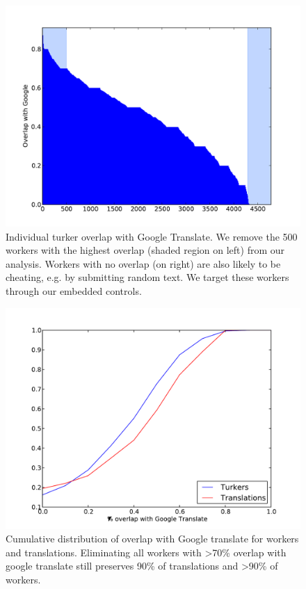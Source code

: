 \documentclass[11pt]{article}
\begin{document}
\begin{figure}[ht]
\includegraphics[width=\linewidth]{figures/turker-googmatch-distribution.pdf}
\caption{Individual turker overlap with Google Translate. We remove the 500 workers with the highest overlap (shaded region on left) from our analysis. Workers with no overlap (on right) are also likely to be cheating, e.g. by submitting random text. We target these workers through our embedded controls.}                
\label{dist}
\end{figure}

\begin{figure}[h]
\centering
\includegraphics[width=\linewidth]{figures/google-cdf-googlangs.pdf}
\caption{Cumulative distribution of overlap with Google translate for workers and translations. Eliminating all workers with \textgreater 70\% overlap with google translate still preserves 90\% of translations and \textgreater 90\% of workers.}
\label{cdf}
\end{figure}
\end{document}
